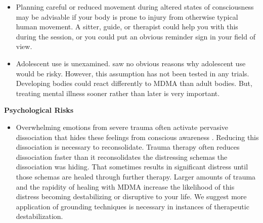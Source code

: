 \documentclass[12pt,letterpaper]{article}
\begin{document}
\begin{itemize}
    \item Planning careful or reduced movement during altered states of consciousness may be advisable if your body is prone to injury from otherwise typical human movement. A sitter, guide, or therapist could help you with this during the session, or you could put an obvious reminder sign in your field of view.
    \item Adolescent use is unexamined. \textcite{kangaslampiAdolescent} saw no obvious reasons why adolescent use would be risky. However, this assumption has not been tested in any trials. Developing bodies could react differently to MDMA than adult bodies. But, treating mental illness sooner rather than later is very important.
\end{itemize}
\noindent \textbf{Psychological Risks}
\begin{itemize}
    \item Overwhelming emotions from severe trauma often activate pervasive dissociation that hides these feelings from conscious awareness \cite{razviPSIP}. Reducing this dissociation is necessary to reconsolidate. Trauma therapy often reduces dissociation faster than it reconsolidates the distressing schemas the dissociation was hiding. That sometimes results in significant distress until those schemas are healed through further therapy. Larger amounts of trauma and the rapidity of healing with MDMA increase the likelihood of this distress becoming destabilizing or disruptive to your life. We suggest more application of grounding techniques is necessary in instances of therapeutic destabilization.   

\end{itemize}
\end{document}
